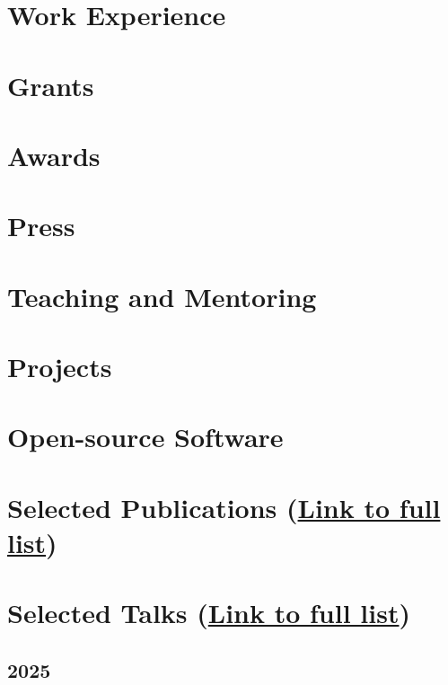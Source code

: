 \documentclass[a4paper,12pt]{article}
\begin{document}
\section{Work Experience}


\section{Grants}


\section{Awards}

\section{Press}

\section{Teaching and Mentoring}


\section{Projects}


\section{Open-source Software}



\section{Selected Publications (\href{https://gi.ece.ucsb.edu/Publications}{Link to full list})}


\section{Selected Talks (\href{https://www.ninamiolane.com/talks}{Link to full list})}

\subsection*{2025}
\end{document}

